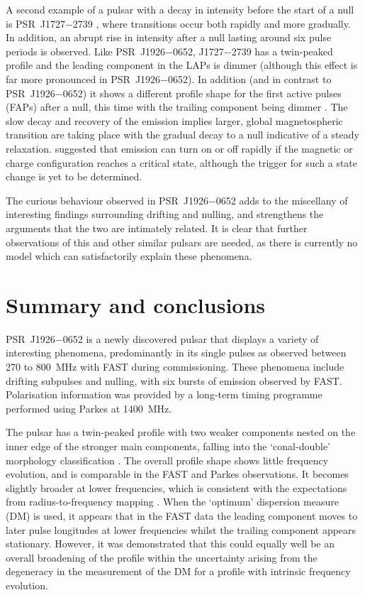 A second example of a pulsar with a decay in intensity before the start of a null is PSR~J1727$-$2739 \citep{WWY+2016}, where transitions occur both rapidly and more gradually. In addition, an abrupt rise in intensity after a null lasting around six pulse periods is observed. Like PSR~J1926$-$0652, J1727$-$2739 has a twin-peaked profile and the leading component in the LAPs is dimmer (although this effect is far more pronounced in PSR~J1926$-$0652). In addition (and in contrast to PSR~J1926$-$0652) it shows a different profile shape for the first active pulses (FAPs) after a null, this time with the trailing component being dimmer \citep{WWY+2016}. The slow decay and recovery of the emission implies larger, global magnetospheric transition are taking place \citep{LHK+2010,MYxx2014} with the gradual decay to a null indicative of a steady relaxation. \citet{WMJx2007} suggested that emission can turn on or off rapidly if the magnetic or charge configuration reaches a critical state, although the trigger for such a state change is yet to be determined.

The curious behaviour observed in PSR~J1926$-$0652 adds to the miscellany of interesting findings surrounding drifting and nulling, and strengthens the arguments that the two are intimately related. It is clear that further observations of this and other similar pulsars are needed, as there is currently no model which can satisfactorily explain these phenomena.




\section{Summary and conclusions}
\label{sec: J1926 - conclusions}


PSR~J1926$-$0652 is a newly discovered pulsar that displays a variety of interesting phenomena, predominantly in its single pulses as observed between 270 to 800~MHz with FAST during commissioning. These phenomena include drifting subpulses and nulling, with six bursts of emission observed by FAST. Polarisation information was provided by a long-term timing programme performed using Parkes at 1400~MHz.

The pulsar has a twin-peaked profile with two weaker components nested on the inner edge of the stronger main components, falling into the `conal-double' morphology classification \citep{Rxxx1983a}. 
The overall profile shape shows little frequency evolution, and is comparable in the FAST and Parkes observations. It becomes slightly broader at lower frequencies, which is consistent with the expectations from radius-to-frequency mapping \citep[e.g.][]{Cxxx1978}. When the `optimum' dispersion measure (DM) is used, it appears that in the FAST data the leading component moves to later pulse longitudes at lower frequencies whilst the trailing component appears stationary. However, it was demonstrated that this could equally well be an overall broadening of the profile within the uncertainty arising from the degeneracy in the measurement of the DM for a profile with intrinsic frequency evolution.

